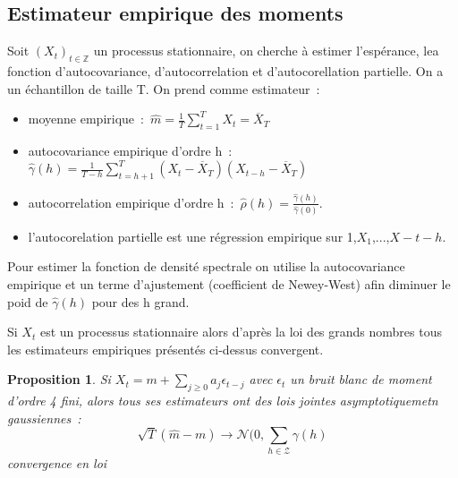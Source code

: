 \documentclass[11pt]{scrartcl} %
\newtheorem{pro}[theorem]{Proposition}
\begin{document}
\subsection{Estimateur empirique des moments}
Soit $(X_t)_{t\in\mathbb{Z}}$ un processus stationnaire, on cherche à estimer l'espérance, lea fonction d'autocovariance, d'autocorrelation et d'autocorellation partielle. On a un échantillon de taille T. On prend comme estimateur~:
\begin{itemize}
\item moyenne empirique~:~$\hat{m}=\frac{1}{T}\sum_{t=1}^TX_t=\overline{X}_T$\\
\item autocovariance empirique d'ordre h~:~$\hat{\gamma}(h)=\frac{1}{T-h}\sum_{t=h+1}^T(X_t-\overline{X}_T)(X_{t-h}-\overline{X}_T)$\\
\item autocorrelation empirique d'ordre h~:~$\hat{\rho}(h)=\frac{\hat{\gamma}(h)}{\hat{\gamma}(0)}$.\\
\item l'autocorelation partielle est une régression empirique sur 1,$X_1$,...,$X-{t-h}$.
\end{itemize}
Pour estimer la fonction de densité spectrale on utilise la autocovariance empirique et un terme d'ajustement (coefficient de Newey-West) afin diminuer le poid de $\hat{\gamma}(h)$ pour des h grand.


Si $X_t$ est un processus stationnaire alors d'après la loi des grands nombres tous les estimateurs empiriques présentés ci-dessus convergent.

\begin{pro}
Si $X_t=m+\sum_{j\geq 0}a_j\epsilon_{t-j}$ avec $\epsilon_t$ un bruit blanc de moment d'ordre 4 fini, alors tous ses estimateurs ont des lois jointes asymptotiquemetn gaussiennes~:
$$
\sqrt{T}\left(\hat{m}-m\right)\rightarrow \mathcal{N}(0,\sum_{h\in\mathcal{Z}}\gamma(h)
$$
convergence en loi
\end{pro}
\end{document}
